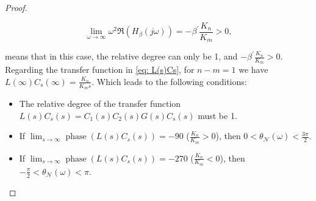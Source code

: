 \begin{proof}
\begin{itemize}
\begin{itemize}
        \begin{equation}
    \lim_{\omega \to \infty} \omega^2\mathfrak{R}(H_\beta(j\omega))=-\beta^{'}\frac{K_{n}}{K_{m}}>0,
    \end{equation}
    \end{itemize}
\end{itemize}
means that in this case, the relative degree can only be 1, and $-\beta^{'}\frac{K_{n}}{K_{m}}>0$. Regarding the transfer function in \eqref{eq: L(s)Cs}, for $n-m=1$ we have $L(\infty)C_s(\infty)=\frac{K_{n}}{K_{m}s}$. Which leads to the following conditions:

    \begin{itemize}
    \item The relative degree of the transfer function $L(s)  C_s(s) = C_1(s)  C_2(s)  G(s) C_s(s)$ must be 1.
    \item If $\lim_{s \to \infty} \operatorname{phase}\left(L(s) C_s(s)\right) = -90$ ($\frac{K_{n}}{K_{m}} > 0$), then $0 < \theta_{\mathcal{N}}(\omega) < \frac{3\pi}{2}$.
    \item If $\lim_{s \to \infty} \operatorname{phase}\left(L(s) C_s(s)\right) = -270$ ($\frac{K_{n}}{K_{m}} < 0$), then $-\frac{\pi}{2} < \theta_{\mathcal{N}}(\omega) < \pi$.
\end{itemize}


\end{proof}
